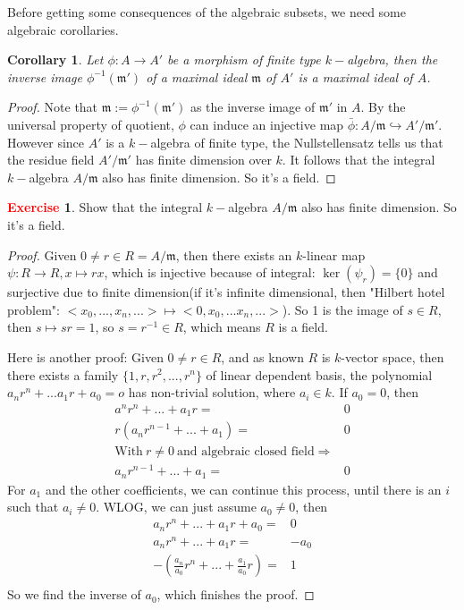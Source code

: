 \documentclass[12pt,a4paper,english]{article}
\theoremstyle{plain}
\newtheorem{coro}[thm]{Corollary}
\theoremstyle{definition}
\newtheorem{exercise}{\textbf{\textcolor{red}{Exercise}}}
\theoremstyle{remark}
\begin{document}
Before getting some consequences of the algebraic subsets, we need some algebraic corollaries. 
\begin{coro}
Let $\phi: A\rightarrow A'$ be a morphism of finite type $k-$algebra, then the inverse image $\phi^{-1}(\mathfrak{m}')$ of a maximal ideal $\mathfrak{m}$ of $A'$ is a maximal ideal of $A$.
\end{coro}
\begin{proof}
Note that $\mathfrak{m}:=\phi^{-1}(\mathfrak{m'})$ as the inverse image of $\mathfrak{m'}$ in $A$. By the universal property of quotient, $\phi$ can induce an injective map $\bar{\phi}: A/\mathfrak{m}\hookrightarrow A'/\mathfrak{m'}$. However since $A'$ is a $k-$algebra of finite type, the Nullstellensatz tells us that the residue field $A'/\mathfrak{m'}$ has finite dimension over $k$.   It follows that the integral $k-$algebra $A/\mathfrak{m}$ also has finite dimension. So it's a field.
\end{proof}
\begin{exercise}
Show that the integral $k-$algebra $A/\mathfrak{m}$ also has finite dimension. So it's a field.
\end{exercise}
\begin{tcolorbox}
\begin{proof}
Given $0\not=r\in R=A/\mathfrak{m}$, then there exists an $k$-linear map $\psi: R\rightarrow R, x\mapsto rx$, which is injective because of integral: $\ker(\psi_{r})=\{0\}$ and surjective due to finite dimension(if it's infinite dimensional, then "Hilbert hotel problem":
$<x_{0},...,x_{n},...>\mapsto<0,x_{0},...x_{n},...>$). So 1 is the image of $s\in R$, then $s\mapsto sr=1$, so $s=r^{-1}\in R$, which means $R$ is a field.

Here is another proof: Given $0\not=r\in R$, and as known $R$ is $k$-vector space, then there exists a family $\{1, r, r^{2},...,r^{n} \}$ of linear dependent basis, the polynomial $a_{n}r^{n}+...a_{1}r+a_{0}=o$ has non-trivial solution, where $a_{i}\in k$. If $a_{0}=0$, then 
\begin{align*}
    a^{n}r^{n}+...+a_{1}r=&0\\
    r(a_{n}r^{n-1}+...+a_{1})=&0\\
    \text{With}\ r\not=0\ \text{and algebraic closed field}\Rightarrow&\\
    a_{n}r^{n-1}+...+a_{1}=&0
\end{align*}
For $a_{1}$ and the other coefficients, we can continue this process, until there is an $i$ such that $a_{i}\not=0$. WLOG, we can just assume $a_{0}\not=0$, then 
\begin{align*}
    a_{n}r^{n}+...+a_{1}r+a_{0}=&0\\
    a_{n}r^{n}+...+a_{1}r=&-a_{0}\\
    -(\frac{a_{n}}{a_{0}}r^{n}+...+\frac{a_{1}}{a_{0}}r)=&1\\
\end{align*}
So we find the inverse of $a_{0}$, which finishes the proof.
\end{proof}
\end{tcolorbox}
\end{document}

